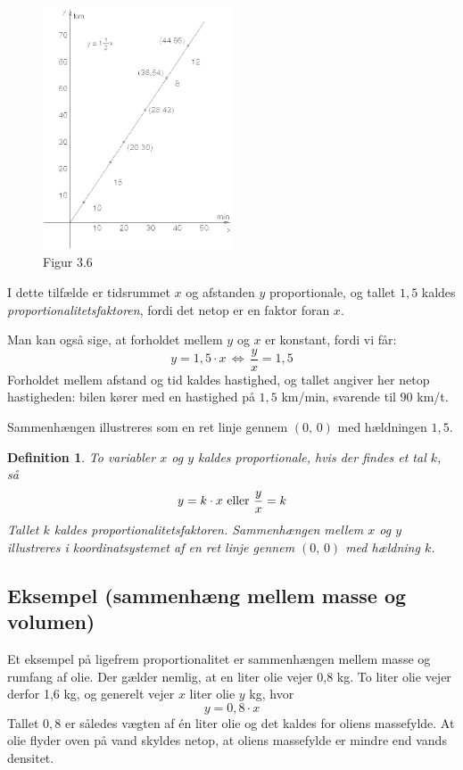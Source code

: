 \documentclass[12pt,oneside,a4paper]{article}
\newtheorem{mydef}[thm]{Definition}
\begin{document}
\begin{figure}[ht]
    \centering
    \includegraphics[width=0.5\textwidth]{fig36}
    \caption{Figur 3.6}
    \label{fig36}
\end{figure}

I dette tilfælde er tidsrummet $x$ og afstanden $y$ proportionale, og tallet
$1,5$ kaldes {\em proportionalitetsfaktoren}, fordi det netop er en faktor foran $x$.

Man kan også sige, at forholdet mellem $y$ og $x$ er konstant, fordi vi får:
$$
y = 1,5\cdot x \, \Leftrightarrow \, \frac{y}{x} = 1,5
$$
Forholdet mellem afstand og tid kaldes hastighed, og tallet angiver her netop
hastigheden: bilen kører med en hastighed på $1,5$ km/min, svarende til $90$
km/t.

Sammenhængen illustreres som en ret linje gennem $(0,\,0)$ med hældningen $1,5$.

\begin{mydef}
    To variabler $x$ og $y$ kaldes proportionale, hvis der findes et tal $k$, så
    $$
    y = k\cdot x \,\, {\rm eller} \,\, \frac{y}{x} = k
    $$
    Tallet $k$ kaldes proportionalitetsfaktoren. Sammenhængen mellem $x$ og $y$
    illustreres i koordinatsystemet af en ret linje gennem $(0,\,0)$ med 
    hældning $k$.
\end{mydef}

\subsection{Eksempel (sammenhæng mellem masse og volumen)}

Et eksempel på ligefrem proportionalitet er sammenhængen mellem masse og rumfang af olie.
Der gælder nemlig, at en liter olie vejer 0,8 kg. To liter olie vejer derfor 1,6 kg,
og generelt vejer $x$ liter olie $y$ kg, hvor
$$
y = 0,8 \cdot x
$$
Tallet $0,8$ er således vægten af én liter olie og det kaldes for oliens
massefylde.  At olie flyder oven på vand skyldes netop, at oliens massefylde er
mindre end vands densitet.
\end{document}
